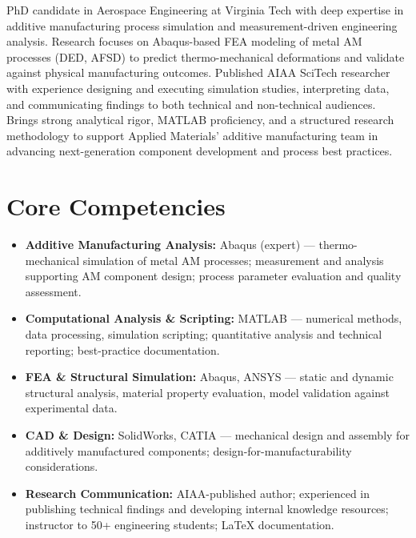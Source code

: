 \documentclass[11pt,a4paper]{moderncv}
\begin{document}
\makecvtitle


\vspace{6pt}
\small{PhD candidate in Aerospace Engineering at Virginia Tech with deep expertise in additive manufacturing process simulation and measurement-driven engineering analysis. Research focuses on Abaqus-based FEA modeling of metal AM processes (DED, AFSD) to predict thermo-mechanical deformations and validate against physical manufacturing outcomes. Published AIAA SciTech researcher with experience designing and executing simulation studies, interpreting data, and communicating findings to both technical and non-technical audiences. Brings strong analytical rigor, MATLAB proficiency, and a structured research methodology to support Applied Materials' additive manufacturing team in advancing next-generation component development and process best practices.}


\section{Core Competencies}
\vspace{1pt}
\begin{itemize}

\item \textbf{Additive Manufacturing Analysis:} Abaqus (expert) --- thermo-mechanical simulation of metal AM processes; measurement and analysis supporting AM component design; process parameter evaluation and quality assessment.
\vspace{1pt}

\item \textbf{Computational Analysis \& Scripting:} MATLAB --- numerical methods, data processing, simulation scripting; quantitative analysis and technical reporting; best-practice documentation.
\vspace{1pt}

\item \textbf{FEA \& Structural Simulation:} Abaqus, ANSYS --- static and dynamic structural analysis, material property evaluation, model validation against experimental data.
\vspace{1pt}

\item \textbf{CAD \& Design:} SolidWorks, CATIA --- mechanical design and assembly for additively manufactured components; design-for-manufacturability considerations.
\vspace{1pt}

\item \textbf{Research Communication:} AIAA-published author; experienced in publishing technical findings and developing internal knowledge resources; instructor to 50+ engineering students; LaTeX documentation.

\end{itemize}
\end{document}
